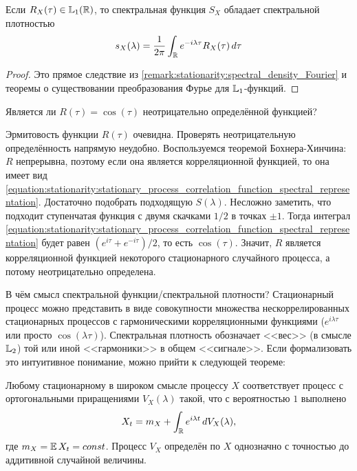 \begin{corollary}
    \label{corollary:stationarity:L1_Fourier}
    Если $ R_X(\tau) \in \mathbb{L}_1(\mathbb{R}) $,
    то спектральная функция $ S_X $ обладает спектральной плотностью
    \[
        s_X(\lambda) = \frac{1}{2 \pi} \int_{\mathbb{R}} e^{-i \lambda \tau} R_X(\tau) \, d\tau
    \]
\end{corollary}

\begin{proof}
    Это прямое следствие из \ref{remark:stationarity:spectral_density_Fourier} и теоремы о существовании преобразования Фурье для $ \mathbb{L}_1 $-функций.
\end{proof}


\begin{exercise}
    \label{exercise:stationarity:cosine_positive_semi_definite}
    Является ли $ R(\tau) = \cos(\tau) $ неотрицательно определённой функцией?
\end{exercise}

\begin{solution}
    Эрмитовость функции $ R(\tau) $ очевидна.
    Проверять неотрицательную определённость напрямую неудобно.
    Воспользуемся теоремой Бохнера-Хинчина:
    $ R $ непрерывна, поэтому если она является корреляционной функцией,
    то она имеет вид \eqref{equation:stationarity:stationary_process_correlation_function_spectral_representation}.
    Достаточно подобрать подходящую $ S(\lambda) $.
    Несложно заметить, что подходит ступенчатая функция с двумя скачками $ 1/2 $ в точках $ \pm 1 $.
    Тогда интеграл \eqref{equation:stationarity:stationary_process_correlation_function_spectral_representation}
    будет равен $ (e^{i \tau} + e^{-i \tau}) / 2 $, то есть $ \cos(\tau) $.
    Значит, $ R $ является корреляционной функцией некоторого стационарного случайного процесса,
    а потому неотрицательно определена.
\end{solution}

В чём смысл спектральной функции/спектральной плотности?
Стационарный процесс можно представить в виде совокупности множества нескоррелированных стационарных процессов
с гармоническими корреляционными функциями ($ e^{i \lambda \tau} $ или просто $ \cos(\lambda \tau) $).
Спектральная плотность обозначает <<вес>> (в смысле $ \mathbb{L}_2 $) той или иной <<гармоники>> в общем <<сигнале>>.
Если формализовать это интуитивное понимание, можно прийти к следующей теореме:

\begin{theorem}[Крамер]
    \label{theorem:stationarity:stochastic_spectral_decomposition}
    Любому стационарному в широком смысле процессу $ X $ соответствует процесс
    с ортогональными приращениями $ V_X(\lambda) $ такой, что с вероятностью $ 1 $ выполнено
    \[
        X_t = m_X + \int_{\mathbb{R}} e^{i \lambda t} \, dV_X(\lambda),
    \]
    где $ m_X = \operatorname{\mathbb{E}} X_t = const $.
    Процесс $ V_X $ определён по $ X $ однозначно с точностью до аддитивной случайной величины.
\end{theorem}

